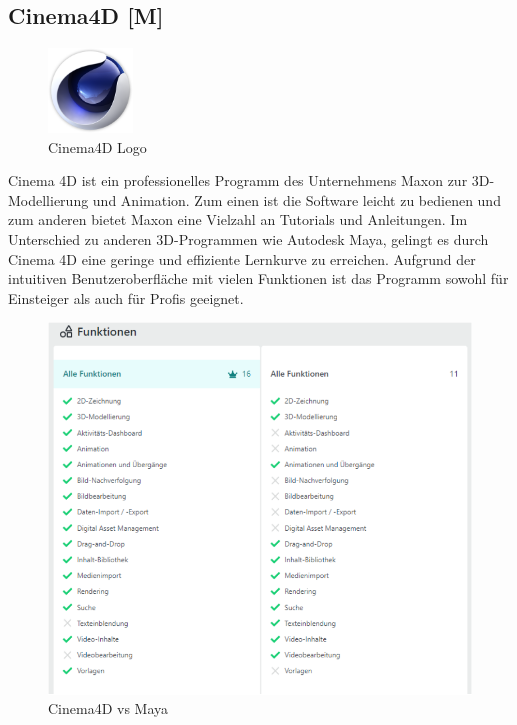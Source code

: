 \subsection{Cinema4D [M]}
\begin{figure}
  \begin{center}
    \includegraphics[width=0.2\textwidth]{pics/cinema4d_logo.png}
   \caption{Cinema4D Logo}
  \end{center}
\end{figure}
Cinema 4D ist ein professionelles Programm des Unternehmens Maxon zur 3D-Modellierung und Animation. Zum einen ist die Software leicht zu bedienen und zum anderen bietet Maxon eine Vielzahl an Tutorials und Anleitungen. Im Unterschied zu anderen 3D-Programmen wie Autodesk Maya, gelingt es durch Cinema 4D eine geringe und effiziente Lernkurve zu erreichen. Aufgrund der intuitiven Benutzeroberfläche mit vielen Funktionen ist das Programm sowohl für Einsteiger als auch für Profis geeignet. \cite{Cinema4D}

\begin{figure} [h t]
    \centering
    \includegraphics[scale=0.7]{pics/c4d-vs-maya.PNG}
    \caption{Cinema4D vs Maya \cite{C4DvsMaya}}
    \label{fig:tech:front:c4d-vs-maya}
  \end{figure}

